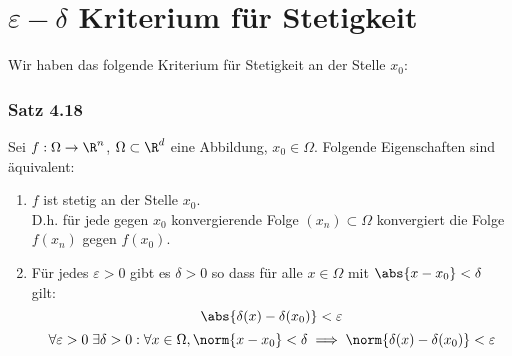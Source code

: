 \section{$\varepsilon -\delta$ Kriterium für Stetigkeit}
Wir haben das folgende Kriterium für Stetigkeit an der Stelle $x_{0}$:

\subsubsection*{Satz 4.18}
Sei $f:\Omega\to\R^{n}$, $\Omega\subset\R^{d}$ eine Abbildung, $x_{0} \in\Omega$. Folgende Eigenschaften sind äquivalent:
\begin{enumerate}
\item $f$ ist stetig an der Stelle $x_{0}$. \\ D.h. für jede gegen $x_{0}$ konvergierende Folge $(x_{n})\subset\Omega$ konvergiert die Folge $f(x_{n})$ gegen $f(x_{0})$.
\item Für jedes $\varepsilon>0$ gibt es $\delta>0$ so dass für alle $x\in\Omega$ mit $\abs{x-x_{0}}<\delta$ gilt:\[ \abs{\delta(x)-\delta(x_{0})}<\varepsilon \]
\[ \forall\varepsilon>0\;\exists\delta>0: \forall x\in\Omega,\norm{x-x_{0}}<\delta \implies \norm{\delta(x)-\delta(x_{0})}<\varepsilon\]
\end{enumerate}

